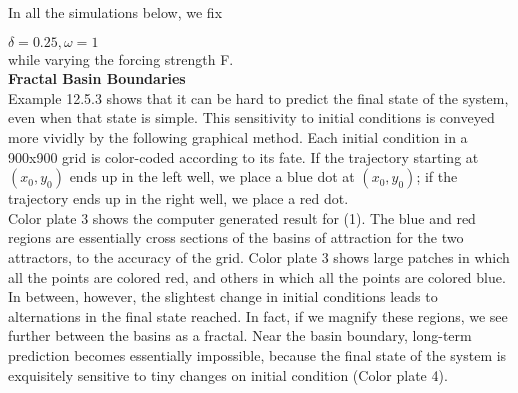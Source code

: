 \documentclass{article}
\newcommand\tab[1][1cm]{\hspace*{#1}}
\begin{document}
In all the simulations below, we fix \\ \tab \tab

$\delta = 0.25, \omega=1$ \\

while varying the forcing strength F. \\

\textbf {Fractal Basin Boundaries} \\

\tab Example 12.5.3 shows that it can be hard to predict the final state of the system, even when that state is simple. This sensitivity to initial conditions is conveyed more vividly by the following graphical method. Each initial condition in a 900x900 grid is color-coded according to its fate. If the trajectory starting at $(x_{0},y_{0})$ ends up in the left well, we place a blue dot at $(x_{0}, y_{0})$; if the trajectory ends up in the right well, we place a red dot. \\ \tab
Color plate 3 shows the computer generated result for (1). The blue and red regions are essentially cross sections of the basins of attraction for the two attractors, to the accuracy of the grid. Color plate 3 shows large patches in which all the points are colored red, and others in which all the points are colored blue. In between, however, the slightest change in initial conditions leads to alternations in  the final state reached. In fact, if we magnify these regions, we see further between the basins as a fractal. Near the basin boundary, long-term prediction becomes essentially impossible, because the final state of the system is exquisitely sensitive to tiny changes on initial condition (Color plate 4). \\
\end{document}
